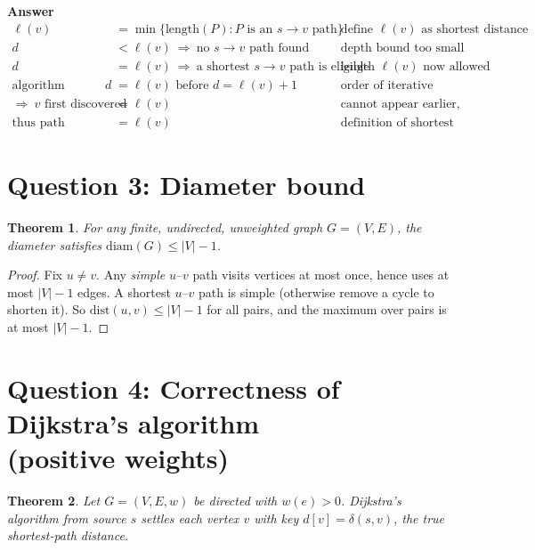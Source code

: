\documentclass[11pt]{article}
\newtheorem{theorem}{Theorem}
\theoremstyle{definition}
\theoremstyle{remark}
\newcommand{\dist}{\mathrm{dist}}
\begin{document}
\noindent\textbf{Answer}\\
\begin{align*}
\ell(v) &= \min\{\text{length}(P): P \text{ is an $s\!\to\! v$ path}\} &\text{define $\ell(v)$ as shortest distance}\\
d &< \ell(v) \ \Rightarrow \ \text{no $s\!\to\! v$ path found} &\text{depth bound too small}\\
d &= \ell(v) \ \Rightarrow \ \text{a shortest $s\!\to\! v$ path is eligible} &\text{length $\ell(v)$ now allowed}\\
\text{algorithm completes all of depth }d &= \ell(v) \text{ before } d=\ell(v)+1 &\text{order of iterative deepening}\\
\Rightarrow\ v \text{ first discovered at depth } &= \ell(v) &\text{cannot appear earlier, appears now}\\
\text{thus path returned has length } &= \ell(v) &\text{definition of shortest path length}
\end{align*}

\section*{Question 3: Diameter bound}
\begin{theorem}
For any finite, undirected, unweighted graph $G=(V,E)$, the diameter satisfies $\mathrm{diam}(G)\le |V|-1$.
\end{theorem}

\begin{proof}
Fix $u\neq v$. Any \emph{simple} $u$–$v$ path visits vertices at most once, hence uses at most $|V|-1$ edges. A shortest $u$–$v$ path is simple (otherwise remove a cycle to shorten it). So $\dist(u,v)\le |V|-1$ for all pairs, and the maximum over pairs is at most $|V|-1$.
\end{proof}

\section*{Question 4: Correctness of Dijkstra's algorithm\\(positive weights)}
\begin{theorem}
Let $G=(V,E,w)$ be directed with $w(e)>0$. Dijkstra’s algorithm from source $s$ settles each vertex $v$ with key $d[v]=\delta(s,v)$, the true shortest-path distance.
\end{theorem}
\end{document}
